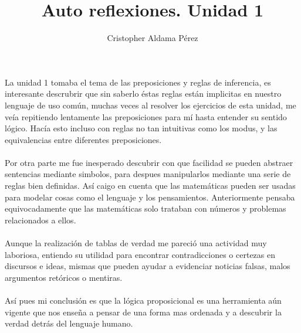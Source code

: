 \documentclass[a4paper,10pt]{article}
\title{Auto reflexiones. Unidad 1}
\author{Cristopher Aldama Pérez}
\begin{document}
\maketitle

La unidad 1 tomaba el tema de las preposiciones y reglas de inferencia, es interesante descrubrir que sin saberlo éstas reglas están implicitas en nuestro lenguaje de uso común, muchas veces al resolver los ejercicios de esta unidad, me veía repitiendo lentamente las preposiciones para mí hasta entender su sentido lógico. Hacía esto incluso con reglas no tan intuitivas como los modus, y las equivalencias entre diferentes preposiciones.
\\
\\Por otra parte me fue inesperado descubrir con que facilidad se pueden abstraer sentencias mediante simbolos, para despues manipularlos mediante una serie de reglas bien definidas. Así caigo en cuenta que las matemáticas pueden ser usadas para modelar cosas como el lenguaje y los pensamientos. Anteriormente pensaba equivocadamente que las matemáticas solo trataban con números y problemas relacionados a ellos.
\\
\\Aunque la realización de tablas de verdad me pareció una actividad muy laboriosa, entiendo su utilidad para encontrar contradicciones o certezas en discursos e ideas, mismas que pueden ayudar a evidenciar noticias falsas, malos argumentos retóricos o mentiras.
\\
\\Así pues mi conclusión es que la lógica proposicional es una herramienta aún vigente que nos enseña a pensar de una forma mas ordenada y a descubrir la verdad detrás del lenguaje humano.
\end{document}
